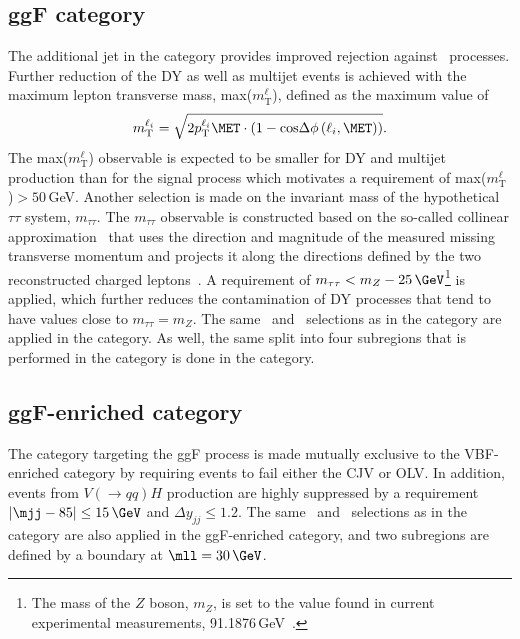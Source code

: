 \subsection{ggF \OneJet category}
\label{subsec:ggf-one-jet-category}
The additional jet in the \OneJet category provides improved rejection against \Ztautau\ processes.
Further reduction of the DY as well as multijet events is achieved with the maximum lepton transverse mass, max($m_{\text{T}}^\ell$), defined as the maximum value of 
\begin{equation}
    m_{\text{T}}^{\ell_i} = \sqrt{ 2 p_\text{T}^{\ell_i} \MET \cdot \left( 1 - \text{cos} \Delta \phi \left( \ell_i, \MET \right) \right) }.
\end{equation}
The max($m_{\text{T}}^\ell$) observable is expected to be smaller for DY and multijet production than for the signal process which motivates a requirement of max($m_{\text{T}}^\ell$)$ > 50\,$GeV.
Another selection is made on the invariant mass of the hypothetical $\tau\tau$ system, $m_{\tau\tau}$.
The $m_{\tau\tau}$ observable is constructed based on the so-called collinear approximation~\cite{Plehn:1999xi} that uses the direction and magnitude of the measured missing transverse momentum and projects it along the directions defined by the two reconstructed charged leptons~\cite{HWWPaper}.
A requirement of $m_{\tau\tau} < m_Z - 25\,\GeV$\footnote{The mass of the $Z$ boson, $m_Z$, is set to the value found in current experimental measurements, 91.1876\,GeV~\cite{PDG2020}.} is applied, which further reduces the contamination of DY processes that tend to have values close to $m_{\tau\tau} = m_Z$.
The same \mll\ and \DPhill\ selections as in the \ZeroJet category are applied in the \OneJet category. As well, the same split into four subregions that is performed in the \ZeroJet category is done in the \OneJet category.

\subsection{ggF-enriched \TwoJet category}
\label{subsec:ggf-two-jet-category}
The \TwoJet category targeting the ggF process is made mutually exclusive to the VBF-enriched \TwoJet category by requiring events to fail either the CJV or OLV. 
In addition, events from $V(\to qq) H$ production are highly suppressed by a requirement $|\mjj  - 85| \le 15\,\GeV$ and $\Delta y_{jj} \le 1.2$. 
The same \mll\ and \DPhill\ selections as in the \ZeroJet category are also applied in the ggF-enriched \TwoJet category, and two subregions are defined by a boundary at $\mll = 30\,\GeV$.

